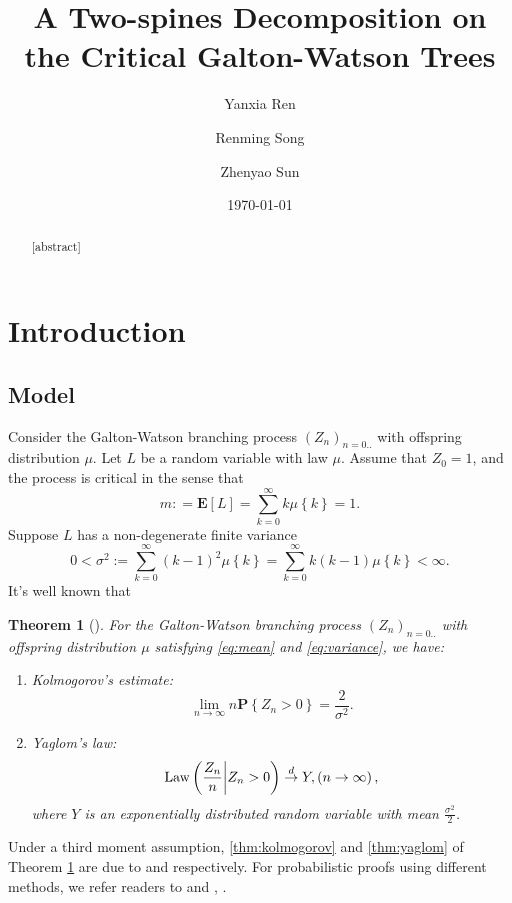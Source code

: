 \documentclass[12pt]{amsart}
\title{A Two-spines Decomposition on the Critical Galton-Watson Trees}
\author{Yanxia Ren}
\author{Renming Song}
\author{Zhenyao Sun}
\date{\today}
\newtheorem{thm}{Theorem}[section]
\theoremstyle{remark}
\numberwithin{equation}{section}
\newcommand{\expr}[1]{\left( #1 \right)}
\newcommand{\set}[1]{\left\{ #1 \right\}}
\newcommand{\law}{\text{\rm Law}}
\newcommand{\tolaw}{\stackrel{d}{\to}}
\newcommand{\expct}{\mathbf E}
\newcommand{\bP}{\mathbf P}\newcommand{\bbP}{\mathbb P}\newcommand{\cP}{\mathcal P}
\begin{document}
\begin{abstract}
	[abstract]
\end{abstract}
	\maketitle	
\section{Introduction}
\subsection{Model}
\label{sec:model}
	Consider the Galton-Watson branching process $(Z_n)_{n=0..}$ with offspring distribution $\mu$. Let $L$ be a random variable with law $\mu$. Assume that $Z_0=1$, and the process is critical in the sense that
\begin{equation}
\label{eq:mean}
		m: 
	= 
		\expct [L] 
	= 
		\sum_{k=0}^\infty k \mu\set{k} 
	= 1. 
\end{equation}
	Suppose $L$ has a non-degenerate finite variance 
\begin{equation}
\label{eq:variance}
		0	
	<	
		\sigma^2 
	:=
		\sum_{k=0}^\infty  (k-1)^2 \mu\set{k} 
	= 
		\sum_{k=0}^\infty k(k-1) \mu\set{k} 
	< 
		\infty. 
\end{equation}
	It's well known that
\begin{thm}[\citet*{kesten1966galton}]
\label{thm:kesten}
	For the Galton-Watson branching process $(Z_n)_{n=0..}$ with offspring distribution $\mu$ satisfying \eqref{eq:mean} and \eqref{eq:variance}, we have:
\begin{enumerate}
\item 
\label{thm:kolmogorov}
	Kolmogorov's estimate:
\begin{equation*}
		\lim_{n \to \infty} n \bP \set{Z_n>0}
	=
		\frac{2}{\sigma^2}.
\end{equation*}
\item
\label{thm:yaglom}
	Yaglom's law: 
\begin{equation*}
		\law\expr{\frac{Z_n}{n}\bigg| Z_n>0}
	\tolaw 
		Y 
	, \expr{n\to\infty},
\end{equation*}
	where $Y$ is an exponentially distributed random variable with mean $\frac{\sigma^2}{2}$.
\end{enumerate}
\end{thm}
\par
	Under a third moment assumption, \eqref{thm:kolmogorov} and \eqref{thm:yaglom} of Theorem \ref{thm:kesten} are due to \citet*{kolmogorov1938losung} and \citet*{yaglom1947certain} respectively. For probabilistic proofs using different methods, we refer readers to \citet*{lyons1995conceptual} and \citet*{geiger1999elementary}, \citet*{geiger2000new}.
\end{document}
